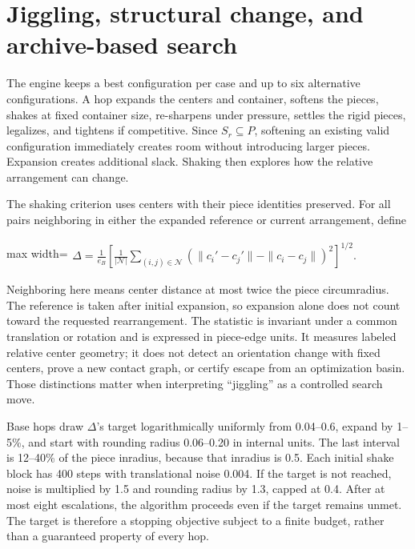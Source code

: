 \documentclass[11pt,a4paper]{article}
\begin{document}
\section{Jiggling, structural change, and archive-based search}

The engine keeps a best configuration per case and up to six alternative configurations. A hop expands the centers and container, softens the pieces, shakes at fixed container size, re-sharpens under pressure, settles the rigid pieces, legalizes, and tightens if competitive. Since \(S_r\subseteq P\), softening an existing valid configuration immediately creates room without introducing larger pieces. Expansion creates additional slack. Shaking then explores how the relative arrangement can change.

The shaking criterion uses centers with their piece identities preserved. For all pairs neighboring in either the expanded reference or current arrangement, define

\begin{center}\begin{adjustbox}{max width=\linewidth}$\displaystyle\begin{aligned}
\Delta=\frac1{e_B}
\left[\frac1{|\mathcal N|}\sum_{(i,j)\in\mathcal N}
\left(\|c_i'-c_j'\|-\|c_i-c_j\|\right)^2\right]^{1/2}.
\end{aligned}$\end{adjustbox}\end{center}

Neighboring here means center distance at most twice the piece circumradius. The reference is taken after initial expansion, so expansion alone does not count toward the requested rearrangement. The statistic is invariant under a common translation or rotation and is expressed in piece-edge units. It measures labeled relative center geometry; it does not detect an orientation change with fixed centers, prove a new contact graph, or certify escape from an optimization basin. Those distinctions matter when interpreting ``jiggling'' as a controlled search move.

Base hops draw \(\Delta\)'s target logarithmically uniformly from 0.04--0.6, expand by 1--5\%, and start with rounding radius 0.06--0.20 in internal units. The last interval is 12--40\% of the piece inradius, because that inradius is 0.5. Each initial shake block has 400 steps with translational noise 0.004. If the target is not reached, noise is multiplied by 1.5 and rounding radius by 1.3, capped at 0.4. After at most eight escalations, the algorithm proceeds even if the target remains unmet. The target is therefore a stopping objective subject to a finite budget, rather than a guaranteed property of every hop.
\end{document}
